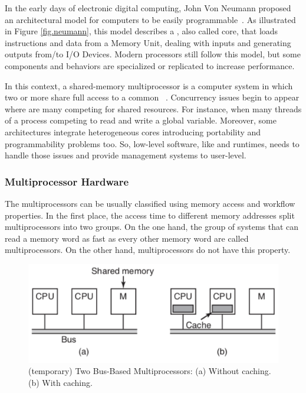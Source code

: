 		In the early days of electronic digital computing, John Von Neumann
		proposed an architectural model for computers to be easily programmable~\cite{von-neumann:model}.
		As illustrated in Figure \ref{fig.neumann}, this model describes a \cpu,
		also called core, that loads instructions and data from a Memory Unit,
		dealing with inputs and generating outputs from/to I/O Devices.
		Modern processors still follow this model, but some components and
		behaviors are specialized or replicated to increase performance.

		In this context, a shared-memory multiprocessor is a computer system
		in which two or more \cpus share full access to a common \ram~\cite{tanenbaum:4ed}.
		Concurrency issues begin to appear where are many \cpus competing for
		shared resources.
		For instance, when many threads of a process competing to read and write a global variable.
		Moreover, some architectures integrate heterogeneous cores introducing portability
		and programmability problems too.
		So, low-level software, like \oses and runtimes, needs to handle those
		issues and provide management systems to user-level.

		\subsubsection{Multiprocessor Hardware}
		\label{sec.multiprocessor_hw}

			The multiprocessors can be usually classified using memory access
			and workflow properties.
			In the first place, the access time to different memory addresses
			split multiprocessors into two groups.
			On the one hand, the group of systems that can read a memory word
			as fast as every other memory word are called \uma multiprocessors.
			On the other hand, \numa multiprocessors do not have this property.

			\begin{figure}[h]
				\centering
				\includegraphics[width=.9\textwidth]{images/uma.png}

				\caption{
					(temporary) Two Bus-Based \uma Multiprocessors: (a) Without caching. (b) With caching.
				}\par
				\label{fig.uma}
			\end{figure}

